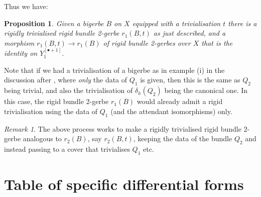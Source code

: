 \documentclass[12pt]{amsart}
\theoremstyle{plain}
\newtheorem{proposition}[theorem]{Proposition}
\theoremstyle{definition}
\theoremstyle{remark}
\newtheorem{remark}[theorem]{Remark}
\numberwithin{equation}{section}
\newcommand{\<}{\langle}
\renewcommand{\>}{\rangle}
\begin{document}
Thus we have:

\begin{proposition}
    Given a bigerbe $B$ on $X$ equipped with a trivialisation $t$ there is a rigidly trivialised rigid bundle 2-gerbe $r_1(B,t)$ as just described, and a morphism $r_1(B,t)\to r_1(B)$ of rigid bundle 2-gerbes over $X$ that is the identity on $Y_1^{[\bullet+1]}$.
\end{proposition}


Note that if we had a trivialisation of a bigerbe as in example (i) in the discussion after \cite[Defintion~4.6]{KM19}, where \emph{only} the data of $Q_1$ is given, then this is the same as $Q_2$ being trivial, and also the trivialisation of $\delta_h(Q_2)$ being the canonical one.
In this case, the rigid bundle 2-gerbe $r_1(B)$ would already admit a rigid trivialisation using the data of $Q_1$ (and the attendant isomorphisms) only.

\begin{remark}
The above process works to make a rigidly trivialised rigid bundle 2-gerbe analogous to $r_2(B)$, say $r_2(B,t)$, keeping the data of the bundle $Q_2$ and instead passing to a cover that trivialises $Q_1$ etc.
\end{remark}




\section{Table of specific differential forms}\label{app:data}
\end{document}
